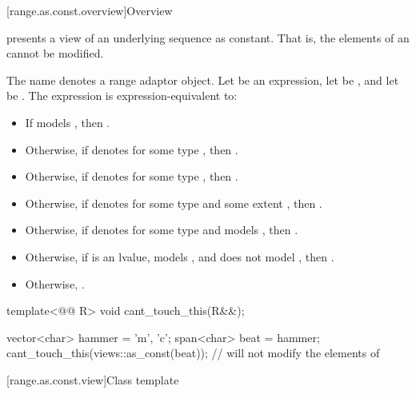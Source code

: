 [range.as.const.overview]{Overview}

\pnum
{} presents a view of an underlying sequence as constant.
That is, the elements of an  cannot be modified.

\pnum
The name  denotes
a range adaptor object.
Let  be an expression,
let  be , and
let  be .
The expression  is expression-equivalent to:
\begin{itemize}
\item
If  models ,
then .
\item
Otherwise,
if  denotes 
for some type , then .

\item
Otherwise, if  denotes 
for some type , then .

\item
Otherwise,
if  denotes 
for some type  and some extent ,
then .
\item
Otherwise,
if  denotes  for some type  and
 models ,
then .
\item
Otherwise,
if  is an lvalue,
 models , and
 does not model ,
then .
\item
Otherwise, .
\end{itemize}

\pnum
\begin{example}
\begin{codeblock}
template<@@ R>
void cant_touch_this(R&&);

vector<char> hammer = {'m', 'c'};
span<char> beat = hammer;
cant_touch_this(views::as_const(beat));         // will not modify the elements of 
\end{codeblock}
\end{example}

[range.as.const.view]{Class template }

